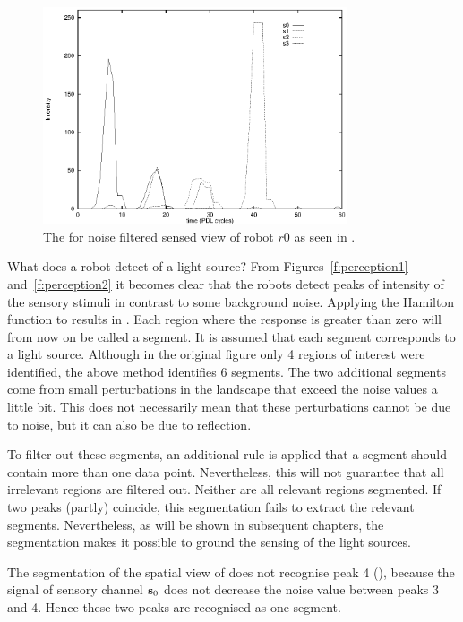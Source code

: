 \begin{figure}
\centerline{\includegraphics[width=9cm]{lang_games/region1.eps}}
\caption{The for noise filtered sensed view of robot $r0$ as seen in .}
\label{f:region1}
\end{figure}

What does a robot detect of a light source? From Figures~\ref{f:perception1} and~\ref{f:perception2} it becomes clear that the robots detect peaks of intensity of the sensory stimuli in contrast to some background noise. Applying the Hamilton function to  results in . Each region where the response is greater than zero will from now on be called a segment. It is assumed that each segment corresponds to a light source. Although in the original figure only 4 regions of interest were identified, the above method identifies 6 segments. The two additional segments come from small perturbations in the landscape that exceed the noise values a little bit. This does not necessarily mean that these perturbations cannot be due to noise, but it can also be due to reflection.

To filter out these segments, an additional rule is applied that a segment should contain more than one data point. Nevertheless, this will not guarantee that all irrelevant regions are filtered out. Neither are all relevant regions segmented. If two peaks (partly) coincide, this segmentation fails to extract the relevant segments. Nevertheless, as will be shown in subsequent chapters, the segmentation makes it possible to ground the sensing of the light sources.

The segmentation of the spatial view of  does not recognise peak 4 (), because the signal of sensory channel ${\bf s}_0$ does not decrease the noise value between peaks 3 and 4. Hence these two peaks are recognised as one segment.

